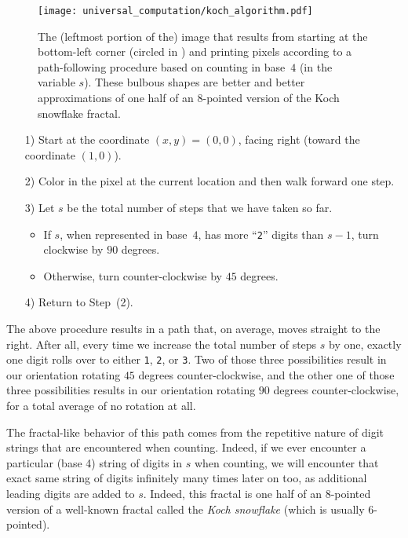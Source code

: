 \begin{figure}[!htb]
	\centering
	\texttt{[image: universal\_computation/koch\_algorithm.pdf]}
	\caption{The (leftmost portion of the) image that results from starting at the bottom-left corner (circled in ) and printing pixels according to a path-following procedure based on counting in base~$4$ (in the variable $s$). These bulbous shapes are better and better approximations of one half of an 8-pointed version of the Koch snowflake fractal.}\label{fig:koch_algorithm}
\end{figure}

\begin{itemize}
	\item[1)] Start at the coordinate $(x,y) = (0,0)$, facing right (toward the coordinate $(1,0)$).\smallskip
	
	\item[2)] Color in the pixel at the current location and then walk forward one step.\smallskip
	
	\item[3)] Let $s$ be the total number of steps that we have taken so far.\smallskip
	\begin{itemize}
		\item If $s$, when represented in base~$4$, has more ``\texttt{2}'' digits than $s-1$, turn clockwise by $90$ degrees.\smallskip
		
		\item Otherwise, turn counter-clockwise by $45$ degrees.\smallskip
	\end{itemize}

	\item[4)] Return to Step~(2).\smallskip
\end{itemize}

The above procedure results in a path that, on average, moves straight to the right. After all, every time we increase the total number of steps $s$ by one, exactly one digit rolls over to either \texttt{1}, \texttt{2}, or \texttt{3}. Two of those three possibilities result in our orientation rotating $45$ degrees counter-clockwise, and the other one of those three possibilities results in our orientation rotating $90$ degrees counter-clockwise, for a total average of no rotation at all.

The fractal-like behavior of this path comes from the repetitive nature of digit strings that are encountered when counting. Indeed, if we ever encounter a particular (base 4) string of digits in $s$ when counting, we will encounter that exact same string of digits infinitely many times later on too, as additional leading digits are added to $s$. Indeed, this fractal is one half of an $8$-pointed version of a well-known fractal called the \emph{Koch snowflake} (which is usually $6$-pointed).

